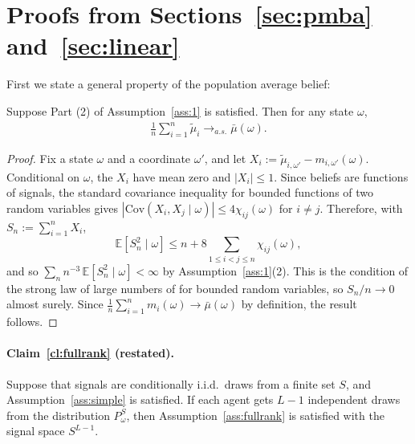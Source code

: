 \documentclass[12pt,reqno]{amsart}
\newcommand{\tmu}{\tilde{\mu}}
\begin{document}
\appendix

\section{Proofs from Sections~\ref{sec:pmba} and~\ref{sec:linear}}\label{app:proofofThm1}


First we state a general property of the population average belief:
\begin{lemma}\label{lemma:beliefsconcentrate}
Suppose Part (2) of Assumption~\ref{ass:1} is satisfied. Then for any state $\omega$,
\begin{gather*}
\frac1n \sum_{i=1}^n \tmu_{i} \to_{a.s.} \bar{\mu}(\omega).
\end{gather*}
\end{lemma}

\begin{proof}
Fix a state $\omega$ and a coordinate $\omega'$, and let $X_i:=\tmu_{i,\omega'}-m_{i,\omega'}(\omega)$. Conditional on $\omega$, the $X_i$ have mean zero and $|X_i|\leq1$. Since beliefs are functions of signals, the standard covariance inequality for bounded functions of two random variables gives $|\mathrm{Cov}(X_i,X_j\mid\omega)|\leq4\chi_{ij}(\omega)$ for $i\neq j$. Therefore, with $S_n:=\sum_{i=1}^nX_i$,
\[
\mathbb{E}[S_n^2\mid\omega]\leq n+8\sum_{1\leq i<j\leq n}\chi_{ij}(\omega),
\]
and so $\sum_{n}n^{-3}\,\mathbb{E}[S_n^2\mid\omega]<\infty$ by Assumption~\ref{ass:1}(2). This is the condition of the strong law of large numbers of \citet{DavenportErdosLeVeque1963} for bounded random variables, so $S_n/n\to0$ almost surely. Since $\frac1n\sum_{i=1}^nm_i(\omega)\to\bar\mu(\omega)$ by definition, the result follows.
\end{proof}

\paragraph{Claim~\ref{cl:fullrank} (restated).}
Suppose that signals are conditionally i.i.d.\ draws from a finite set $S$, and Assumption~\ref{ass:simple} is satisfied. If each agent gets $L-1$ independent draws from the distribution $P_{\omega }^{S}$, then Assumption~\ref{ass:fullrank} is satisfied with the signal space $S^{L-1}$.
\end{document}
